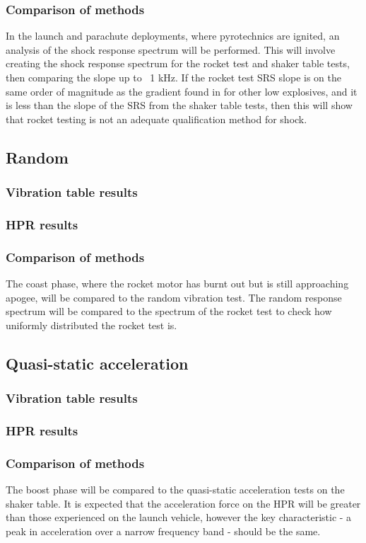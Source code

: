 \documentclass[a4paper,11pt]{article}
\begin{document}
\subsubsection{Comparison of methods}
In the launch and parachute deployments, where pyrotechnics are ignited, an analysis of the shock response spectrum will be performed. This will involve creating the shock response spectrum for the rocket test and shaker table tests, then comparing the slope up to ~1 kHz. If the rocket test SRS slope is on the same order of magnitude as the gradient found in \cite{wang2023numerical} for other low explosives, and it is less than the slope of the SRS from the shaker table tests, then this will show that rocket testing is not an adequate qualification method for shock.

\subsection{Random}
\subsubsection{Vibration table results}
\subsubsection{HPR results}
\subsubsection{Comparison of methods}
The coast phase, where the rocket motor has burnt out but is still approaching apogee, will be compared to the random vibration test. The random response spectrum will be compared to the spectrum of the rocket test to check how uniformly distributed the rocket test is.

\subsection{Quasi-static acceleration}
\subsubsection{Vibration table results}
\subsubsection{HPR results}
\subsubsection{Comparison of methods}
The boost phase will be compared to the quasi-static acceleration tests on the shaker table. It is expected that the acceleration force on the HPR will be greater than those experienced on the launch vehicle, however the key characteristic - a peak in acceleration over a narrow frequency band - should be the same.
\end{document}
